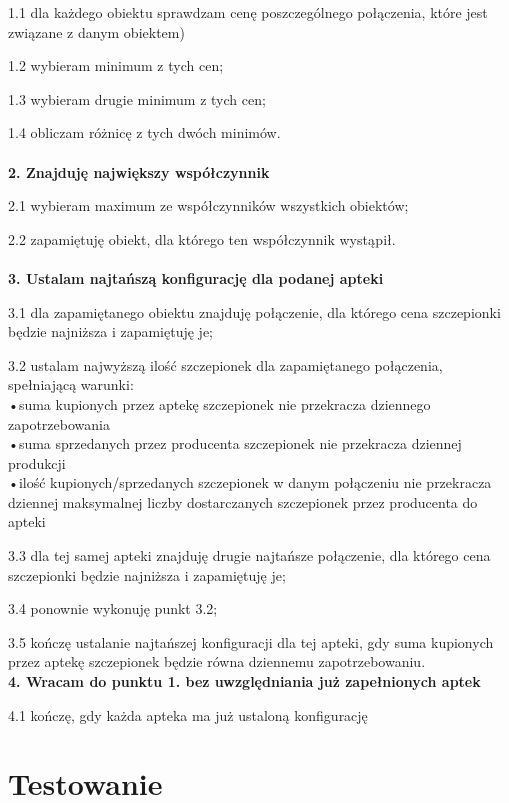 \documentclass[]{article}
\begin{document}
    1.1 dla każdego obiektu sprawdzam cenę poszczególnego połączenia, które jest związane z danym obiektem)

    1.2 wybieram minimum z tych cen;

    1.3 wybieram drugie minimum z tych cen;

    1.4 obliczam różnicę z tych dwóch minimów.\\\\
    \textbf{2. Znajduję największy współczynnik}

    2.1 wybieram maximum ze współczynników wszystkich obiektów;

    2.2 zapamiętuję obiekt, dla którego ten współczynnik wystąpił.\\\\
    \textbf{3. Ustalam najtańszą konfigurację dla podanej apteki}

    3.1 dla zapamiętanego obiektu znajduję połączenie, dla którego cena szczepionki będzie najniższa i zapamiętuję je;

    3.2 ustalam najwyższą ilość szczepionek dla zapamiętanego połączenia, spełniającą warunki:\\
    \tab •suma kupionych przez aptekę szczepionek nie przekracza dziennego \\\tab zapotrzebowania\\
    \tab •suma sprzedanych przez producenta szczepionek nie przekracza dziennej produkcji\\
    \tab •ilość kupionych/sprzedanych szczepionek w danym połączeniu nie przekracza\\\tab  dziennej maksymalnej liczby dostarczanych szczepionek przez producenta do apteki

    3.3 dla tej samej apteki znajduję drugie najtańsze połączenie, dla którego cena szczepionki będzie najniższa i zapamiętuję je;

    3.4 ponownie wykonuję punkt 3.2;

    3.5 kończę ustalanie najtańszej konfiguracji dla tej apteki, gdy suma kupionych przez aptekę szczepionek będzie równa dziennemu zapotrzebowaniu.\\
    \textbf{4. Wracam do punktu 1. bez uwzględniania już zapełnionych aptek}

    4.1 kończę, gdy każda apteka ma już ustaloną konfigurację


    \section{Testowanie}
\end{document}

